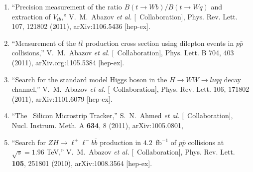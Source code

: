 \begin{enumerate}


\item ``Precision measurement of the ratio $B(t\to Wb)/B(t\to Wq)$ and
extraction of $V_{tb}$,''
V.~M.~Abazov {\it et al.}  [\dzero\ Collaboration],
Phys. Rev. Lett. 107, 121802 (2011),
arXiv:1106.5436 [hep-ex].

\item ``Measurement of the $t{\bar t}$ production cross section using 
dilepton events in $p{\bar p}$ collisions,''
V.~M.~Abazov {\it et al.}  [\dzero\ Collaboration],
Phys. Lett. B 704, 403 (2011),   
arXiv.org:1105.5384 [hep-ex].

\item ``Search for the standard model Higgs boson in the $H\to WW\to l\nu qq$ decay channel,''
V.~M.~Abazov {\it et al.}  [\dzero\ Collaboration],
Phys. Rev. Lett. 106, 171802 (2011),
arXiv:1101.6079 [hep-ex].


\item%
``The \dzero\ Silicon Microstrip Tracker,''
    S.~N.~Ahmed {\it et al.} [\dzero\ Collaboration],
    Nucl. Instrum. Meth. A {\bf 634}, 8 (2011),   arXiv:1005.0801,

\item ``Search for $ZH \rightarrow \ell^+\ell^-b\bar{b}$ production in
$4.2$~fb$^{-1}$ of $p\bar{p}$ collisions at $\sqrt{s}=1.96$ TeV,''
V.~M.~Abazov {\it et al.}  [\dzero\ Collaboration],
Phys. Rev. Lett. {\bf 105}, 251801 (2010),
arXiv:1008.3564 [hep-ex].



\end{enumerate}
